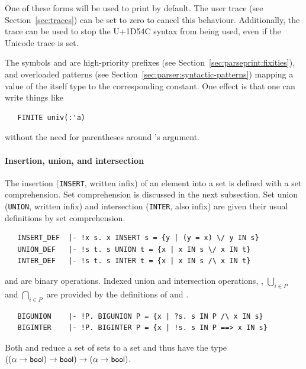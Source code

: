 {One of these forms will be used to print  by default.
The user trace (see Section~\ref{sec:traces})  can be set to zero to cancel this behaviour.
Additionally, the trace  can be used to stop the U+1D54C syntax from being used, even if the Unicode trace is set.

The symbols  and  are high-priority prefixes (see Section~\ref{sec:parseprint:fixities}), and overloaded patterns (see Section~\ref{sec:parser:syntactic-patterns}) mapping a value of the itself type to the corresponding  constant.
One effect is that one can write things like
\begin{hol}
\begin{verbatim}
   FINITE univ(:'a)
\end{verbatim}
\end{hol}
without the need for parentheses around 's argument.

\paragraph{Insertion, union, and intersection}

The insertion ({\small\verb+INSERT+}, written infix) of an element
into a set is defined with a set comprehension. Set comprehension is
discussed in the next subsection. Set union ({\small\verb+UNION+},
written infix) and intersection ({\small\verb+INTER+}, also infix)
are given their usual definitions by set comprehension.
\begin{hol}
\begin{verbatim}
   INSERT_DEF  |- !x s. x INSERT s = {y | (y = x) \/ y IN s}
   UNION_DEF   |- !s t. s UNION t = {x | x IN s \/ x IN t}
   INTER_DEF   |- !s t. s INTER t = {x | x IN s /\ x IN t}
\end{verbatim}
\end{hol}
 and  are binary
operations. Indexed union and intersection operations, \ie,
$\bigcup_{i \in P}$ and $\bigcap_{i \in P}$ are provided by the
definitions of   and .
\begin{hol}
\begin{verbatim}
   BIGUNION    |- !P. BIGUNION P = {x | ?s. s IN P /\ x IN s}
   BIGINTER    |- !P. BIGINTER P = {x | !s. s IN P ==> x IN s}
\end{verbatim}
\end{hol}
Both  and  reduce a set of sets to a
set and thus have the type
$((\alpha\to\mbox{\small{\textbf{\sf{bool}}}})\to\mbox{\small{\textbf{\sf{bool}}}})\to (\alpha\to\mbox{\small{\textbf{\sf{bool}}}})$.

}
